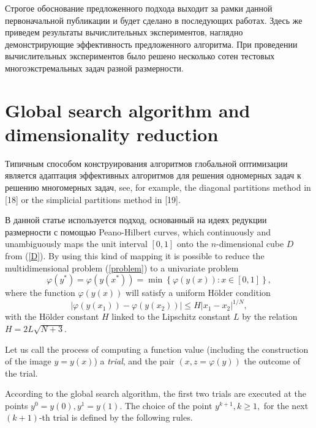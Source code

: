 \documentclass[runningheads]{llncs}
\begin{document}
Строгое обоснование предложенного подхода выходит за рамки данной первоначальной публикации и будет сделано в последующих работах. Здесь же приведем результаты вычислительных экспериментов, наглядно демонстрирующие эффективность предложенного алгоритма. При проведении вычислительных экспериментов было решено несколько сотен тестовых многоэкстремальных задач разной размерности.


\section{Global search algorithm and dimensionality reduction}

Типичным способом конструирования алгоритмов глобальной оптимизации является адаптация эффективных алгоритмов для решения одномерных задач к решению многомерных задач, see, for example, the diagonal partitions method in [18] or
the simplicial partitions method in [19].

В данной статье используется подход, основанный на идеях редукции размерности с помощью Peano-Hilbert curves, which continuously and unambiguously maps the unit interval $[0,1]$ onto the $n$-dimensional cube $D$ from (\ref{D}). By using this kind of mapping it is possible to reduce the multidimensional problem (\ref{problem}) to a univariate problem
\[
\varphi(y^\ast)=\varphi(y(x^\ast))=\min{\left\{\varphi(y(x)): x\in[0,1]\right\}},
\]
where the function $\varphi(y(x))$ will satisfy a uniform H{\"o}lder condition
\[
\left|\varphi(y(x_1))-\varphi(y(x_2))\right|\leq H\left|x_1-x_2\right|^{1/N},
\]
with the H{\"o}lder constant $H$ linked to the Lipschitz constant $L$ by the relation
$ H=2 L \sqrt{N+3}$.

Let us call the process of computing a function value (including the construction of the image $y=y(x)$) a \textit{trial}, and the pair $(x, z = \varphi(y))$ the outcome of the trial.


According to the global search algorithm, the first two trials are executed at 
the points $y^0=y(0), y^1=y(1)$. The choice of the point $y^{k+1},k\geq 1,$  
for the next $(k+1)$-th trial is defined by the following rules.
\end{document}
